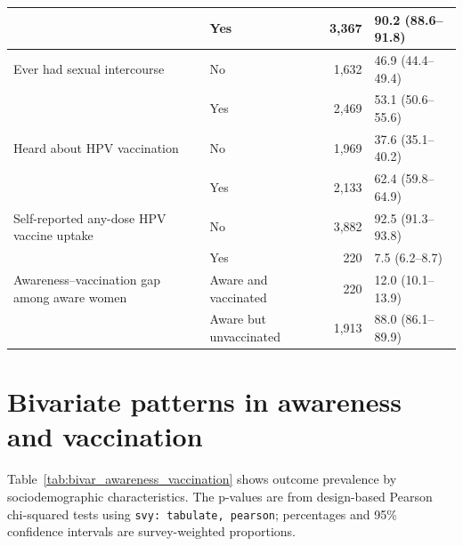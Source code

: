 \begin{table}[H]
\begin{tabular}{|p{4.8cm}|p{3.5cm}|r|p{3.0cm}|}
 & Yes & 3,367 & 90.2 (88.6--91.8) \\
\hline
Ever had sexual intercourse & No & 1,632 & 46.9 (44.4--49.4) \\
 & Yes & 2,469 & 53.1 (50.6--55.6) \\
\hline
Heard about HPV vaccination & No & 1,969 & 37.6 (35.1--40.2) \\
 & Yes & 2,133 & 62.4 (59.8--64.9) \\
\hline
Self-reported any-dose HPV vaccine uptake & No & 3,882 & 92.5 (91.3--93.8) \\
 & Yes & 220 & 7.5 (6.2--8.7) \\
\hline
Awareness--vaccination gap among aware women & Aware and vaccinated & 220 & 12.0 (10.1--13.9) \\
 & Aware but unvaccinated & 1,913 & 88.0 (86.1--89.9) \\
\hline
\end{tabular}
\label{tab:descriptive}
\end{table}
\FloatBarrier

\section{Bivariate patterns in awareness and vaccination}

Table~\ref{tab:bivar_awareness_vaccination} shows outcome prevalence by sociodemographic characteristics. The p-values are from design-based Pearson chi-squared tests using \texttt{svy: tabulate, pearson}; percentages and 95\% confidence intervals are survey-weighted proportions.

